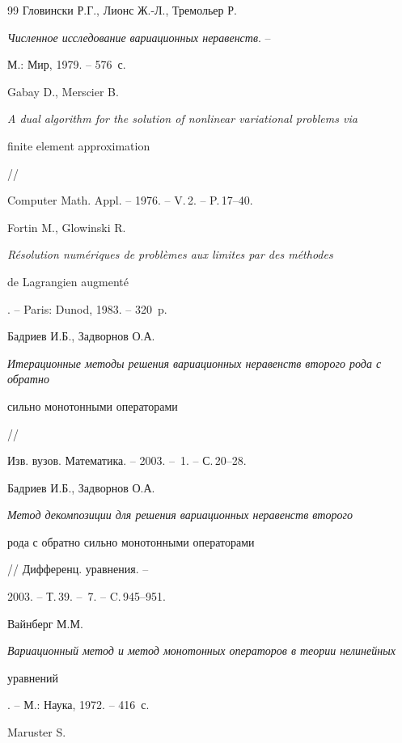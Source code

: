 \begin{thebibliography}{99}
Гловински Р.Г., Лионс Ж.-Л., Тремольер Р.


{\em Численное исследование вариационных неравенств}. --


М.: Мир, 1979. -- 576~с.





 Gabay D., Merscier B.


{\em A dual algorithm for the solution of nonlinear variational problems via 


finite element approximation} // 


Computer Math. Appl. -- 1976. -- V.\,2. -- P.\,17--40. 







Fortin M., Glowinski R.


{\em R\'esolution num\'eriques de probl\`emes aux limites par des m\'ethodes 


de Lagrangien augment\'e}. -- Paris: Dunod, 1983. -- 320~p.





 Бадриев И.Б., Задворнов О.А. 


{\em Итерационные методы решения вариационных неравенств второго рода с обратно


сильно монотонными операторами} // 


Изв. вузов. Математика. -- 2003. -- \No\,1. -- С.\,20--28. 





 Бадриев И.Б., Задворнов О.А. 


{\em Метод декомпозиции для решения вариационных неравенств второго 


рода с обратно сильно монотонными операторами} // Дифференц. уравнения. --


2003. -- Т.\,39. -- \No\,7. -- C.\,945--951.







Вайнберг М.М.


{\em Вариационный метод и метод монотонных операторов в теории нелинейных


уравнений}. -- М.: Наука, 1972. -- 416~с.





 Maruster S.



\end{thebibliography}
